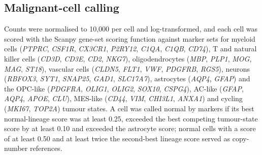 \documentclass[11pt,a4paper]{article}
\begin{document}
\subsection{Malignant-cell calling}
Counts were normalised to 10,000 per cell and log-transformed, and each cell was scored with the Scanpy gene-set scoring function
against marker sets for myeloid cells (\textit{PTPRC}, \textit{CSF1R}, \textit{CX3CR1}, \textit{P2RY12}, \textit{C1QA},
\textit{C1QB}, \textit{CD74}), T and natural killer cells (\textit{CD3D}, \textit{CD3E}, \textit{CD2}, \textit{NKG7}),
oligodendrocytes (\textit{MBP}, \textit{PLP1}, \textit{MOG}, \textit{MAG}, \textit{ST18}), vascular cells
(\textit{CLDN5}, \textit{FLT1}, \textit{VWF}, \textit{PDGFRB}, \textit{RGS5}), neurons (\textit{RBFOX3}, \textit{SYT1},
\textit{SNAP25}, \textit{GAD1}, \textit{SLC17A7}), astrocytes (\textit{AQP4}, \textit{GFAP}) and the OPC-like
(\textit{PDGFRA}, \textit{OLIG1}, \textit{OLIG2}, \textit{SOX10}, \textit{CSPG4}), AC-like (\textit{GFAP}, \textit{AQP4},
\textit{APOE}, \textit{CLU}), MES-like (\textit{CD44}, \textit{VIM}, \textit{CHI3L1}, \textit{ANXA1}) and cycling
(\textit{MKI67}, \textit{TOP2A}) tumour states. A cell was called normal by markers if its best normal-lineage score was at
least 0.25, exceeded the best competing tumour-state score by at least 0.10 and exceeded the astrocyte score; normal cells
with a score of at least 0.50 and at least twice the second-best lineage score served as copy-number references.
\end{document}
